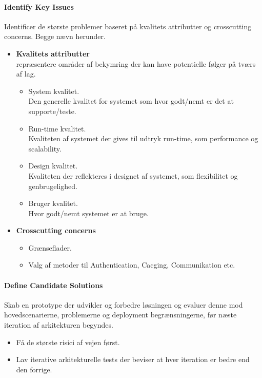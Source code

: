
\paragraph{Identify Key Issues}
Identificer de største problemer baseret på kvalitets attributter og crosscutting concerns. Begge nævn herunder.

\begin{itemize}
	\item \textbf{Kvalitets attributter}\\
	repræsentere områder af bekymring der kan have potentielle følger på tværs af lag.
	\begin{itemize}
		\item System kvalitet.\\
		Den generelle kvalitet for systemet som hvor godt/nemt er det at supporte/teste.
		\item Run-time kvalitet.\\
		Kvaliteten af systemet der gives til udtryk run-time, som performance og scalability.
		\item Design kvalitet.\\
		Kvaliteten der reflekteres i designet af systemet, som flexibilitet og genbrugelighed.
		\item Bruger kvalitet.\\
		Hvor godt/nemt systemet er at bruge.
	\end{itemize}
	\item \textbf{Crosscutting concerns}
	\begin{itemize}
		\item Grænseflader.
		\item Valg af metoder til Authentication, Cacging, Communikation etc.
	\end{itemize}
\end{itemize}

\paragraph{Define Candidate Solutions}
Skab en prototype der udvikler og forbedre løsningen og evaluer denne mod hovedscenarierne, problemerne og deployment begrænsningerne, før næste iteration af arkitekturen begyndes.

\begin{itemize}
	\item Få de største risici af vejen først.
	\item Lav iterative arkitekturelle tests der beviser at hver iteration er bedre end den forrige.
\end{itemize}

